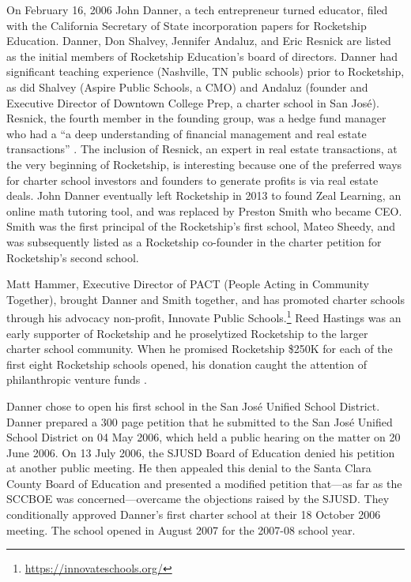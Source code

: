 On February 16, 2006 John Danner, a tech entrepreneur turned educator, filed with the California Secretary of State incorporation papers for Rocketship Education. Danner, Don Shalvey, Jennifer Andaluz, and Eric Resnick are listed as the initial members of Rocketship Education's board of directors. Danner had significant teaching experience (Nashville, TN public schools) prior to Rocketship, as did Shalvey (Aspire Public Schools, a CMO) and Andaluz (founder and Executive Director of Downtown College Prep, a charter school in San José). Resnick, the fourth member in the founding group, was a hedge fund manager who had a ``a deep understanding of financial management and real estate transactions'' \parencite[13]{Danner2006}. The inclusion of Resnick, an expert in real estate transactions, at the very beginning of Rocketship, is interesting because one of the preferred ways for charter school investors and founders to generate profits is via real estate deals. John Danner eventually left Rocketship in 2013 to found Zeal Learning, an online math tutoring tool, and was replaced by Preston Smith who became CEO\@. Smith was the first principal of the Rocketship's first school, Mateo Sheedy, and was subsequently listed as a Rocketship co-founder in the charter petition for Rocketship's second school. %

Matt Hammer, Executive Director of PACT (People Acting in Community Together), brought Danner and Smith together, and has promoted charter schools through his advocacy non-profit, Innovate Public Schools.\footnote{\url{https://innovateschools.org/}} Reed Hastings was an early supporter of Rocketship and he proselytized Rocketship to the larger charter school community. When he promised Rocketship \$250K for each of the first eight Rocketship schools opened, his donation caught the attention of philanthropic venture funds \parencite[50]{Whitmire2014}. 

Danner chose to open his first school in the San José Unified School District. Danner prepared a 300 page petition that he submitted to the San José Unified School District on 04 May 2006, which held a public hearing on the matter on 20 June 2006. On 13 July 2006, the SJUSD Board of Education denied his petition at another public meeting. He then appealed this denial to the Santa Clara County Board of Education and presented a modified petition that—as far as the SCCBOE was concerned—overcame the objections raised by the SJUSD\@. They conditionally approved Danner's first charter school at their 18 October 2006 meeting. The school opened in August 2007 for the 2007-08 school year.

